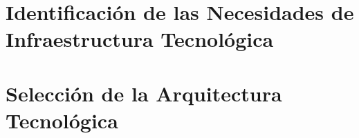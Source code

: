 \section{Identificación de las Necesidades de Infraestructura Tecnológica} 

\newpage
\section{Selección de la Arquitectura Tecnológica} 